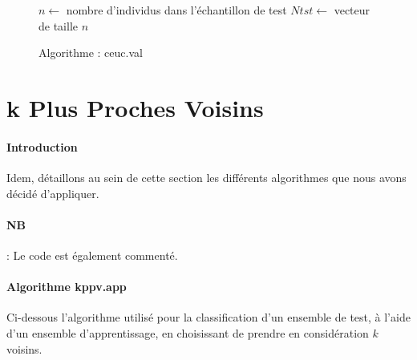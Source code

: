 \documentclass{report}
\begin{document}
\begin{figure}[h!]
\begin{center}

\begin{algorithm}[H]

    \BlankLine
    \BlankLine
    \BlankLine

    $n \leftarrow$ nombre d'individus dans l'échantillon de test\;
    $Ntst \leftarrow$ vecteur de taille $n$\;
    \BlankLine


    \BlankLine
    \BlankLine
    \BlankLine

 \caption{Algorithme : ceuc.val}
\end{algorithm}

\end{center}
\end{figure}


\section{k Plus Proches Voisins}
\paragraph{Introduction}
Idem, détaillons au sein de cette section les différents algorithmes que nous avons décidé d'appliquer.
\paragraph{NB} : Le code est également commenté.

\newpage
\paragraph{Algorithme kppv.app}
Ci-dessous l'algorithme utilisé pour la classification d'un ensemble de test, à l'aide d'un ensemble d'apprentissage, en choisissant de prendre en considération $k$ voisins.
\end{document}

